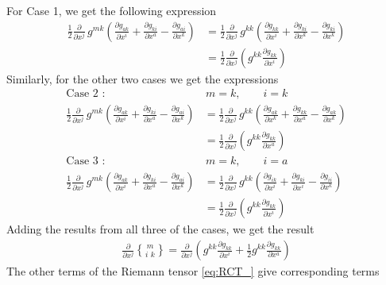 \documentclass[main.tex]{subfiles}
\begin{document}
For Case 1, we get the following expression
\begin{align*}
\frac{1}{2}\frac{\partial}{\partial x^j} \, g^{mk} \left(\frac{\partial g_{ak}}{\partial x^i} + 
\frac{\partial g_{ki}}{\partial x^a} - \frac{\partial g_{ai}}{\partial x^k}\right) &=
\frac{1}{2}\frac{\partial}{\partial x^j} \, g^{kk} \left(\frac{\partial g_{kk}}{\partial x^i} + 
\frac{\partial g_{ki}}{\partial x^k} - \frac{\partial g_{ki}}{\partial x^k}\right)  
\nonumber
\\
&= \frac{1}{2}\frac{\partial}{\partial x^j} \left( g^{kk} \frac{\partial g_{kk}}{\partial x^i}\right)
\end{align*}
Similarly, for the other two cases we get the expressions
\begin{align*}
\mbox{Case 2 : } &\, m=k, \qquad i=k \nonumber
\\
\frac{1}{2}\frac{\partial}{\partial x^j} \, g^{mk} \left(\frac{\partial g_{ak}}{\partial x^i} + 
\frac{\partial g_{ki}}{\partial x^a} - \frac{\partial g_{ai}}{\partial x^k}\right) &=
\frac{1}{2}\frac{\partial}{\partial x^j} \, g^{kk} \left(\frac{\partial g_{ak}}{\partial x^k} + 
\frac{\partial g_{kk}}{\partial x^a} - \frac{\partial g_{ak}}{\partial x^k}\right) 
\nonumber
\\
&= \frac{1}{2}\frac{\partial}{\partial x^j} \left( g^{kk} \frac{\partial g_{kk}}{\partial x^a}\right)
\\
\mbox{Case 3 : } &\, m=k, \qquad i=a \nonumber
\\
\frac{1}{2}\frac{\partial}{\partial x^j} \, g^{mk} \left(\frac{\partial g_{ak}}{\partial x^i} + 
\frac{\partial g_{ki}}{\partial x^a} - \frac{\partial g_{ai}}{\partial x^k}\right) &=
\frac{1}{2}\frac{\partial}{\partial x^j} \, g^{kk} \left(\frac{\partial g_{ik}}{\partial x^i} + 
\frac{\partial g_{ki}}{\partial x^i} - \frac{\partial g_{ii}}{\partial x^k}\right) 
\nonumber
\\
&= \frac{1}{2}\frac{\partial}{\partial x^j} \left( g^{kk} \frac{\partial g_{kk}}{\partial x^i}\right)
\end{align*}
Adding the results from all three of the cases, we get the result
\begin{align}
\frac{\partial}{\partial x^j}{m \brace i\,\,k} =
\frac{\partial}{\partial x^j} \left(g^{kk} \frac{\partial g_{kk}}{\partial x^i} + \frac{1}{2}g^{kk}\frac{\partial g_{kk}}{\partial x^a}\right)
\end{align}
The other terms of the Riemann tensor \eqref{eq:RCT_} give corresponding terms
\end{document}
